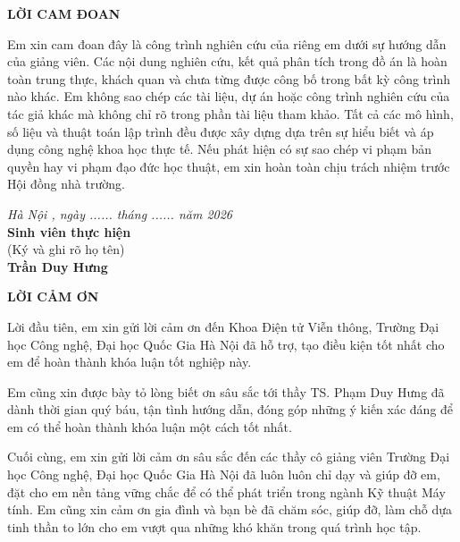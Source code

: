 \documentclass{uetgraduation}
\begin{document}
\begin{center}
    \textbf{\fontsize{13pt}{19pt}\selectfont LỜI CAM ĐOAN}
\end{center}
\vspace{0.5cm}

Em xin cam đoan đây là công trình nghiên cứu của riêng em dưới sự hướng dẫn của giảng viên. Các nội dung nghiên cứu, kết quả phân tích trong đồ án là hoàn toàn trung thực, khách quan và chưa từng được công bố trong bất kỳ công trình nào khác. Em không sao chép các tài liệu, dự án hoặc công trình nghiên cứu của tác giả khác mà không chỉ rõ trong phần tài liệu tham khảo. Tất cả các mô hình, số liệu và thuật toán lập trình đều được xây dựng dựa trên sự hiểu biết và áp dụng công nghệ khoa học thực tế. Nếu phát hiện có sự sao chép vi phạm bản quyền hay vi phạm đạo đức học thuật, em xin hoàn toàn chịu trách nhiệm trước Hội đồng nhà trường.

\vspace{1.5cm}
\hfill
\begin{minipage}{0.4\textwidth}
\centering
\textit{Hà Nội , ngày ...... tháng ...... năm 2026} \\[1cm]
\textbf{Sinh viên thực hiện}\\(Ký và ghi rõ họ tên) \\[2cm] \textbf{Trần Duy Hưng}
\end{minipage}
\clearpage


\begin{center}
    \textbf{\fontsize{13pt}{19pt}\selectfont LỜI CẢM ƠN}
\end{center}
\vspace{0.5cm}

Lời đầu tiên, em xin gửi lời cảm ơn đến Khoa Điện tử Viễn thông, Trường Đại học Công nghệ, Đại học Quốc Gia Hà Nội đã hỗ trợ, tạo điều kiện tốt nhất cho em để hoàn thành khóa luận tốt nghiệp này.

Em cũng xin được bày tỏ lòng biết ơn sâu sắc tới thầy TS. Phạm Duy Hưng đã dành thời gian quý báu, tận tình hướng dẫn, đóng góp những ý kiến xác đáng để em có thể hoàn thành khóa luận một cách tốt nhất.

Cuối cùng, em xin gửi lời cảm ơn sâu sắc đến các thầy cô giảng viên Trường Đại học Công nghệ, Đại học Quốc Gia Hà Nội đã luôn luôn chỉ dạy và giúp đỡ em, đặt cho em nền tảng vững chắc để có thể phát triển trong ngành Kỹ thuật Máy tính. Em cũng xin cảm ơn gia đình và bạn bè đã chăm sóc, giúp đỡ, làm chỗ dựa tinh thần to lớn cho em vượt qua những khó khăn trong quá trình học tập.
\end{document}
